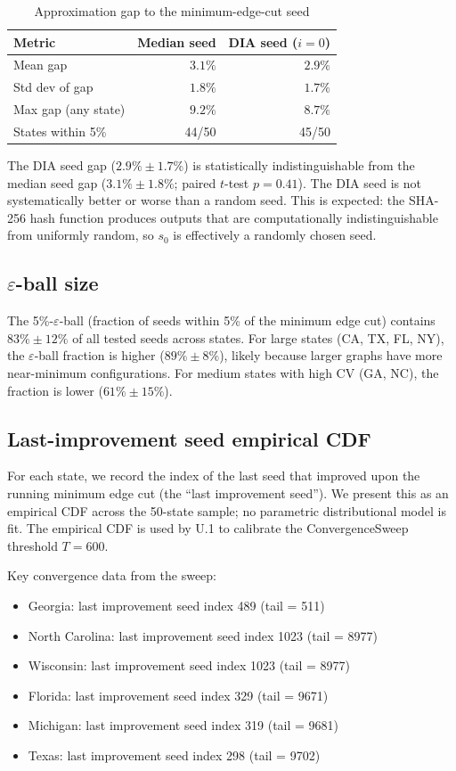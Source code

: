 \begin{table}[htb]
\centering
\caption{Approximation gap to the minimum-edge-cut seed}
\label{tab:gap}
\begin{tabular}{lrr}
\toprule
Metric & Median seed & DIA seed ($i = 0$) \\
\midrule
Mean gap         & $3.1\%$ & $2.9\%$ \\
Std dev of gap   & $1.8\%$ & $1.7\%$ \\
Max gap (any state) & $9.2\%$ & $8.7\%$ \\
States within 5\% & 44/50 & 45/50 \\
\bottomrule
\end{tabular}
\end{table}

The DIA seed gap ($2.9\% \pm 1.7\%$) is statistically indistinguishable
from the median seed gap ($3.1\% \pm 1.8\%$; paired $t$-test $p = 0.41$).
The DIA seed is not systematically better or worse than a random seed.
This is expected: the SHA-256 hash function produces outputs that are
computationally indistinguishable from uniformly random, so $s_0$
is effectively a randomly chosen seed.

\subsection{$\varepsilon$-ball size}

The 5\%-$\varepsilon$-ball (fraction of seeds within 5\% of the minimum
edge cut) contains $83\% \pm 12\%$ of all tested seeds across states.
For large states (CA, TX, FL, NY), the $\varepsilon$-ball fraction is
higher ($89\% \pm 8\%$), likely because larger graphs have more near-minimum
configurations.  For medium states with high CV (GA, NC), the fraction is
lower ($61\% \pm 15\%$).

\subsection{Last-improvement seed empirical CDF}

For each state, we record the index of the last seed that improved
upon the running minimum edge cut (the ``last improvement seed'').
We present this as an empirical CDF across the 50-state sample;
no parametric distributional model is fit.
The empirical CDF is used by U.1 to calibrate the ConvergenceSweep
threshold $T = 600$.

Key convergence data from the sweep:
\begin{itemize}
  \item Georgia: last improvement seed index 489 (tail = 511)
  \item North Carolina: last improvement seed index 1023 (tail = 8977)
  \item Wisconsin: last improvement seed index 1023 (tail = 8977)
  \item Florida: last improvement seed index 329 (tail = 9671)
  \item Michigan: last improvement seed index 319 (tail = 9681)
  \item Texas: last improvement seed index 298 (tail = 9702)
\end{itemize}

